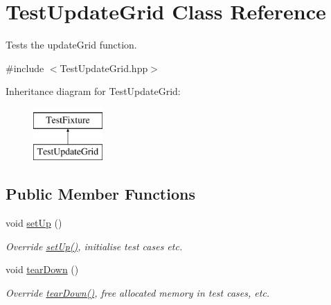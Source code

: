 \hypertarget{class_test_update_grid}{}\section{Test\+Update\+Grid Class Reference}
\label{class_test_update_grid}


Tests the update\+Grid function.  




{\ttfamily \#include $<$Test\+Update\+Grid.\+hpp$>$}

Inheritance diagram for Test\+Update\+Grid\+:\begin{figure}[H]
\begin{center}
\leavevmode
\includegraphics[height=2.000000cm]{class_test_update_grid}
\end{center}
\end{figure}
\subsection*{Public Member Functions}
\begin{DoxyCompactItemize}
\item 
\mbox{\label{class_test_update_grid_a0a50fd0d318cb2fe27dfc7fa5c8a0f33}} 
void \hyperlink{class_test_update_grid_a0a50fd0d318cb2fe27dfc7fa5c8a0f33}{set\+Up} ()
\begin{DoxyCompactList}\small\item\em Override \hyperlink{class_test_update_grid_a0a50fd0d318cb2fe27dfc7fa5c8a0f33}{set\+Up()}, initialise test cases etc. \end{DoxyCompactList}\item 
\mbox{\label{class_test_update_grid_a482b2a4a0f2fd8252032bde4b28c3778}} 
void \hyperlink{class_test_update_grid_a482b2a4a0f2fd8252032bde4b28c3778}{tear\+Down} ()
\begin{DoxyCompactList}\small\item\em Override \hyperlink{class_test_update_grid_a482b2a4a0f2fd8252032bde4b28c3778}{tear\+Down()}, free allocated memory in test cases, etc. \end{DoxyCompactList}\end{DoxyCompactItemize}
